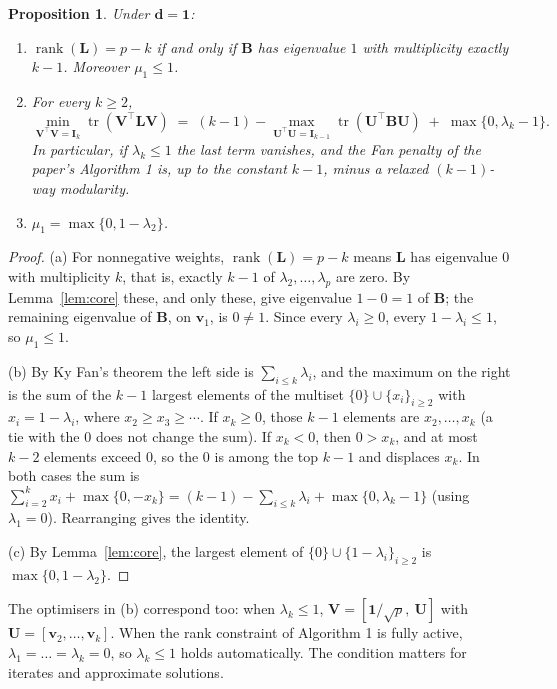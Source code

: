 \documentclass[11pt,a4paper]{article}
\newcommand{\Lap}{\mathbf{L}}
\newcommand{\Bmat}{\mathbf{B}}
\newcommand{\Imat}{\mathbf{I}}
\newcommand{\Vmat}{\mathbf{V}}
\newcommand{\Umat}{\mathbf{U}}
\newcommand{\dvec}{\mathbf{d}}
\newcommand{\vvec}{\mathbf{v}}
\newcommand{\one}{\mathbf{1}}
\newcommand{\tr}{\operatorname{tr}}
\newtheorem{proposition}{Proposition}
\theoremstyle{remark}
\begin{document}
\begin{proposition}\label{prop:lemma}
Under $\dvec=\one$:
\begin{enumerate}[label=(\alph*)]
\item $\operatorname{rank}(\Lap)=p-k$ if and only if $\Bmat$ has eigenvalue $1$ with
  multiplicity exactly $k-1$. Moreover $\mu_1\le1$.
\item For every $k\ge2$,
  \[
    \min_{\Vmat^\top\Vmat=\Imat_k}\tr(\Vmat^\top\Lap\Vmat)
    \;=\;(k-1)-\max_{\Umat^\top\Umat=\Imat_{k-1}}\tr(\Umat^\top\Bmat\Umat)
    \;+\;\max\{0,\lambda_k-1\}.
  \]
  In particular, if $\lambda_k\le1$ the last term vanishes, and the Fan penalty of
  the paper's Algorithm 1 is, up to the constant $k-1$, minus a relaxed $(k-1)$-way
  modularity.
\item $\mu_1=\max\{0,1-\lambda_2\}$.
\end{enumerate}
\end{proposition}
\begin{proof}
(a) For nonnegative weights, $\operatorname{rank}(\Lap)=p-k$ means $\Lap$ has
eigenvalue 0 with multiplicity $k$, that is, exactly $k-1$ of
$\lambda_2,\dots,\lambda_p$ are zero. By Lemma~\ref{lem:core} these, and only these,
give eigenvalue $1-0=1$ of $\Bmat$; the remaining eigenvalue of $\Bmat$, on
$\vvec_1$, is $0\neq1$. Since every $\lambda_i\ge0$, every $1-\lambda_i\le1$, so
$\mu_1\le1$.

(b) By Ky Fan's theorem the left side is $\sum_{i\le k}\lambda_i$, and the maximum on
the right is the sum of the $k-1$ largest elements of the multiset
$\{0\}\cup\{x_i\}_{i\ge2}$ with $x_i=1-\lambda_i$, where
$x_2\ge x_3\ge\cdots$. If $x_k\ge0$, those $k-1$ elements are $x_2,\dots,x_k$
(a tie with the $0$ does not change the sum). If $x_k<0$, then $0>x_k$, and at most
$k-2$ elements exceed $0$, so the $0$ is among the top $k-1$ and displaces $x_k$. In
both cases the sum is $\sum_{i=2}^{k}x_i+\max\{0,-x_k\}
=(k-1)-\sum_{i\le k}\lambda_i+\max\{0,\lambda_k-1\}$ (using $\lambda_1=0$).
Rearranging gives the identity.

(c) By Lemma~\ref{lem:core}, the largest element of $\{0\}\cup\{1-\lambda_i\}_{i\ge2}$
is $\max\{0,1-\lambda_2\}$.
\end{proof}

The optimisers in (b) correspond too: when $\lambda_k\le1$, $\Vmat=[\one/\sqrt p,\ \Umat]$
with $\Umat=[\vvec_2,\dots,\vvec_k]$. When the rank constraint of Algorithm 1 is fully
active, $\lambda_1=\dots=\lambda_k=0$, so $\lambda_k\le1$ holds automatically. The
condition matters for iterates and approximate solutions.
\end{document}
